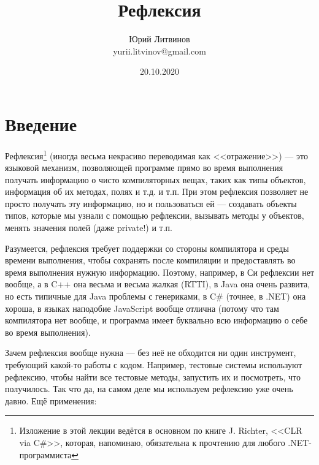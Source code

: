 \documentclass[a5paper]{article}
\title{Рефлексия}
\author{Юрий Литвинов\\\small{yurii.litvinov@gmail.com}}
\date{20.10.2020}
\begin{document}
\maketitle
\thispagestyle{empty}

\section*{Введение}

Рефлексия\footnote{Изложение в этой лекции ведётся в основном по книге J. Richter, <<CLR via C\#>>, которая, напоминаю, обязательна к прочтению для любого .NET-программиста} (иногда весьма некрасиво переводимая как <<отражение>>) --- это языковой механизм, позволяющей программе прямо во время выполнения получать информацию о чисто компиляторных вещах, таких как типы объектов, информация об их методах, полях и т.д. и т.п. При этом рефлексия позволяет не просто получать эту информацию, но и пользоваться ей --- создавать объекты типов, которые мы узнали с помощью рефлексии, вызывать методы у объектов, менять значения полей (даже private!) и т.п. 

Разумеется, рефлексия требует поддержки со стороны компилятора и среды времени выполнения, чтобы сохранять после компиляции и предоставлять во время выполнения нужную информацию. Поэтому, например, в Си рефлексии нет вообще, а в C++ она весьма и весьма жалкая (RTTI), в Java она очень развита, но есть типичные для Java проблемы с генериками, в C\# (точнее, в .NET) она хороша, в языках наподобие JavaScript вообще отлична (потому что там компилятора нет вообще, и программа имеет буквально всю информацию о себе во время выполнения).

Зачем рефлексия вообще нужна --- без неё не обходится ни один инструмент, требующий какой-то работы с кодом. Например, тестовые системы используют рефлексию, чтобы найти все тестовые методы, запустить их и посмотреть, что получилось. Так что да, на самом деле мы используем рефлексию уже очень давно. Ещё применения:
\end{document}
